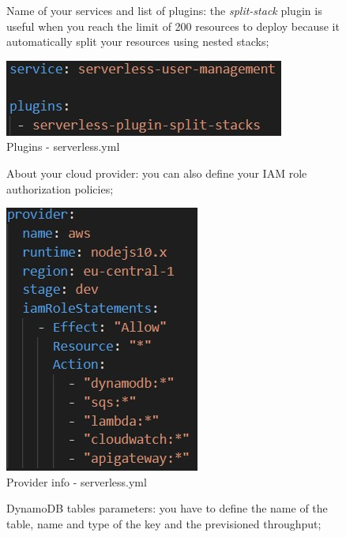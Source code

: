 \begin{itemize}
\begin{figure} [H]
\item Name of your services and list of plugins: the \emph{split-stack} plugin is useful when you reach the limit of 200 resources to deploy because it automatically split your resources using nested stacks;

	\centering
	\includegraphics[scale=1.2]{../Img/serv1}
	\caption{Plugins - serverless.yml}\label{}
\end{figure}

\begin{figure} [H]
\item About your cloud provider: you can also define your IAM role authorization policies;

	\centering
	\includegraphics[scale=1.2]{../Img/serv2}
	\caption{Provider info - serverless.yml}\label{}
\end{figure}

\begin{figure} [H]
\item DynamoDB tables parameters: you have to define the name of the table, name and type of the key and the previsioned throughput;


\end{figure}
\end{itemize}
